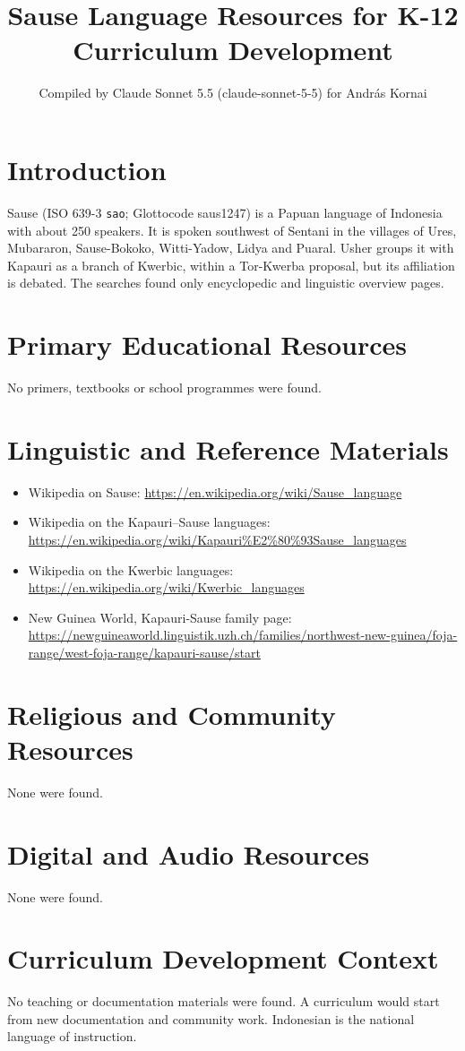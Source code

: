 \documentclass[12pt]{article}
\title{Sause Language Resources for K-12 Curriculum Development}
\author{Compiled by Claude Sonnet 5.5 (claude-sonnet-5-5) for Andr\'as Kornai}
\date{}
\begin{document}
\maketitle

\section{Introduction}
Sause (ISO 639-3 \texttt{sao}; Glottocode saus1247) is a Papuan language of Indonesia with about 250 speakers. It is spoken southwest of Sentani in the villages of Ures, Mubararon, Sause-Bokoko, Witti-Yadow, Lidya and Puaral. Usher groups it with Kapauri as a branch of Kwerbic, within a Tor-Kwerba proposal, but its affiliation is debated. The searches found only encyclopedic and linguistic overview pages.

\section{Primary Educational Resources}
No primers, textbooks or school programmes were found.

\section{Linguistic and Reference Materials}
\begin{itemize}
\item Wikipedia on Sause: \url{https://en.wikipedia.org/wiki/Sause_language}
\item Wikipedia on the Kapauri--Sause languages: \url{https://en.wikipedia.org/wiki/Kapauri%E2%80%93Sause_languages}
\item Wikipedia on the Kwerbic languages: \url{https://en.wikipedia.org/wiki/Kwerbic_languages}
\item New Guinea World, Kapauri-Sause family page: \url{https://newguineaworld.linguistik.uzh.ch/families/northwest-new-guinea/foja-range/west-foja-range/kapauri-sause/start}
\end{itemize}

\section{Religious and Community Resources}
None were found.

\section{Digital and Audio Resources}
None were found.

\section{Curriculum Development Context}
No teaching or documentation materials were found. A curriculum would start from new documentation and community work. Indonesian is the national language of instruction.
\end{document}

